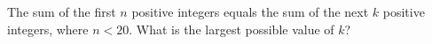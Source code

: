 The sum of the first $n$ positive integers equals the sum of the next $k$ positive integers, where $n<20$. What is the largest possible value of $k$?
